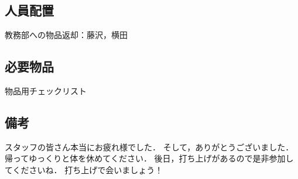 \subsection{人員配置}
教務部への物品返却：藤沢，横田

\subsection{必要物品}
物品用チェックリスト


\subsection{備考}
スタッフの皆さん本当にお疲れ様でした．
そして，ありがとうございました．
帰ってゆっくりと体を休めてください．
後日，打ち上げがあるので是非参加してくださいね．
打ち上げで会いましょう！

%

